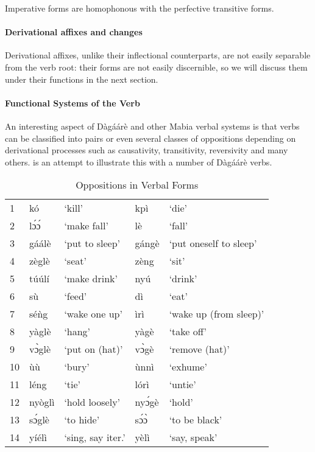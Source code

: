 \begin{refsection}
Imperative forms are homophonous with the perfective transitive forms.

\paragraph{Derivational affixes and changes}

Derivational affixes, unlike their inflectional counterparts, are not easily separable
from the verb root: their forms are not easily discernible, so we will discuss them under their
functions in the next section.

\paragraph{Functional Systems of the Verb}
An interesting aspect of Dàgáárè and other Mabia verbal systems is that verbs can
be classified into pairs or even several classes of oppositions depending on derivational
processes such as causativity, transitivity, reversivity and many others.  is an
attempt to illustrate this with a number of Dàgáárè verbs.

\begin{table}[]
    \centering
    \begin{tabular}{lllll}
1 &kó &‘kill’ &kpì &‘die’\\
2 &lɔ́ɔ́& ‘make fall’& lè& ‘fall’\\
3 &gáálè& ‘put to sleep’& gángè &‘put oneself to sleep’\\
4 &zèglè &‘seat’& zèng &‘sit’\\
5& túúlí& ‘make drink’ &nyú &‘drink’\\
6 &sù &‘feed’ &dì & ‘eat’\\
7& séǹg& ‘wake one up’ &ìrì &‘wake up (from sleep)’\\
8& yàglè& ‘hang’& yàgè& ‘take off’\\
9 &vɔ̀glè &‘put on (hat)’ &vɔ̀gè &‘remove (hat)’\\
10 &ùù &‘bury’ &ùnnì &‘exhume’\\
11 &léng &‘tie’ &lórì &‘untie’\\
12 &nyòglì &‘hold loosely’ &nyɔ́gè &‘hold’\\
13& sɔ́glè &‘to hide’ &sɔ́ɔ̀ &‘to be black’\\
14 &yíélì& ‘sing, say iter.' &yèlì& ‘say, speak’\\
    \end{tabular}
    \caption{Oppositions in Verbal Forms}
    \label{tab:verbOppositions}
\end{table}


\end{refsection}
